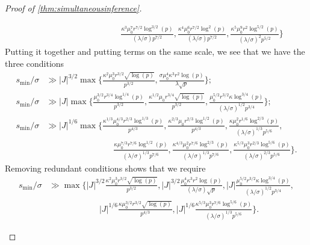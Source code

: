 \documentclass[10pt]{article}
\newcommand{\0}{{\mathbf{0}}}
\newcommand{\1}{{\mathbf{1}}}
\begin{document}
\begin{proof}[Proof of \cref{thm:simultaneousinference}]
\begin{itemize}
\begin{align*}
    &\qquad \qquad \qquad \qquad \qquad \frac{\kappa^3 \mu_0^7 r^{7/2} \log^{3/2}(p)}{ (\lambda/\sigma) p^{7/2}}, \frac{\kappa^4 \mu_0^6 r^{7/2} \log^2(p)}{(\lambda/\sigma) p^{7/2}}, \frac{\kappa^5 \mu_0^9 r^2 \log^{5/2}(p)}{(\lambda/\sigma)^2 p^{5/2}} \bigg\}
\end{align*}
 Putting it together and putting terms on the same scale, we see that we have the three conditions
 \begin{align*}
  s_{\min}/\sigma  &\gg  |J|^{3/2}\max\bigg\{ \frac{\kappa^2 \mu_0^3 r^{3/2} \sqrt{\log(p)}}{p^{3/2}}, \frac{\sigma \mu_0^4 \kappa^3 r^2 \log(p)}{\lambda \sqrt{p}} \bigg\}; \\
        s_{\min}/\sigma &\gg |J| \max\bigg\{ \frac{ \mu_0^{3/2} r^{3/4} \log^{1/4}(p)}{p^{3/2}}, \frac{ \kappa^{1/2} \mu_0 r^{3/4} \sqrt{\log(p)}}{p^{3/2}}, \frac{ \mu_0^{5/2} r^{3/2} \kappa \log^{3/4}(p)}{(\lambda/\sigma)^{1/2} p^{3/4}} \bigg\}; \\
        s_{\min}/\sigma &\gg |J|^{1/6} \max\bigg\{ \frac{\kappa^{1/3}\mu_0^{4/3} r^{2/3} \log^{1/3}(p)}{p^{4/3}}, \frac{\kappa^{2/3} \mu_0 r^{2/3} \log^{1/2}(p)}{p^{4/3}}, \frac{\kappa \mu_0^2 r^{1/6} \log^{2/3}(p)}{(\lambda/\sigma)^{1/3} p^{5/6}}, \\
        &\qquad \qquad \qquad \qquad \frac{\kappa \mu_0^{7/3} r^{7/6} \log^{1/2}(p)}{(\lambda/\sigma)^{1/3} p^{7/6}}, \frac{\kappa^{4/3} \mu_0^2 r^{7/6} \log^{2/3}(p)}{(\lambda/\sigma)^{1/3}p^{7/6}}, \frac{\kappa^{5/3}\mu_0^3 r^{2/3} \log^{5/6}(p)}{(\lambda/\sigma)^{2/3} p^{5/6}} \bigg\}.
 \end{align*}
 Removing redundant conditions shows that we require
 \begin{align*}
     s_{\min}/\sigma &\gg \max\bigg\{ |J|^{3/2}  \frac{\kappa^2 \mu_0^3 r^{3/2} \sqrt{\log(p)}}{p^{3/2}}, |J|^{3/2} \frac{ \mu_0^4 \kappa^3 r^2 \log(p)}{(\lambda/\sigma) \sqrt{p}}, |J| \frac{ \mu_0^{5/2} r^{3/2} \kappa \log^{3/4}(p)}{(\lambda/\sigma)^{1/2} p^{3/4}}, \\
     &\qquad \qquad \qquad  |J|^{1/6} \frac{\kappa \mu_0^{3/2} r^{3/2} \sqrt{\log(p)}}{p^{4/3}}, |J|^{1/6} \frac{\kappa^{5/3}\mu_0^{3} r^{7/6} \log^{5/6}(p)}{(\lambda/\sigma)^{1/3} p^{5/6}}\bigg\}.
 \end{align*}

\end{itemize}
\end{proof}
\end{document}
